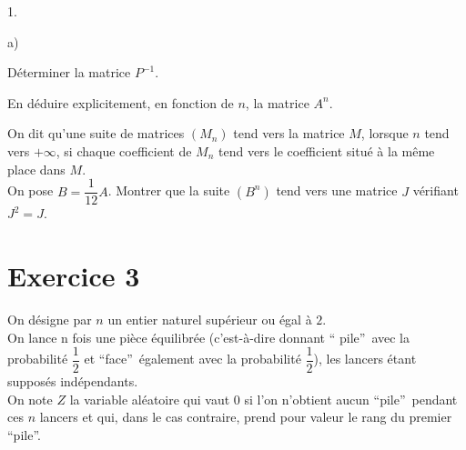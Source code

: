 \documentclass[11pt]{article}%
\begin{document}
\begin{noliste}{1.}
\item 

\begin{noliste}{a)}
 \setlength{\itemsep}{2mm}
\item Déterminer la matrice $P^{-1}$.

\item En déduire explicitement, en fonction de $n$, la matrice $A^{n}$.

\item On dit qu'une suite de matrices $(M_{n})$ tend vers la matrice
$M$,
lorsque $n$ tend vers $ + \infty $, si chaque coefficient de $M_{n}$
tend
vers le coefficient situé à la même place dans $M$. \\
On pose $B = \dfrac{1}{12}A$. Montrer que la suite $(B^{n})$ tend vers
une
matrice $J$ vérifiant $J^{2} = J$.
\end{noliste}
\end{noliste}

\newpage

\section*{Exercice 3}

On désigne par $n$ un entier naturel supérieur ou égal à $2$.\\
On lance n fois une pièce équilibrée (c'est-à-dire donnant
\textquotedblleft
pile\textquotedblright\ avec la probabilité $\dfrac{1}{2}$ et
\textquotedblleft face\textquotedblright\ également avec la probabilité
$
\dfrac{1}{2}$), les lancers étant supposés indépendants. \\
On note $Z$ la variable aléatoire qui vaut 0 si l'on n'obtient aucun
\textquotedblleft pile\textquotedblright\ pendant ces $n$ lancers et
qui,
dans le cas contraire, prend pour valeur le rang du premier
\textquotedblleft pile\textquotedblright.
\end{document}
